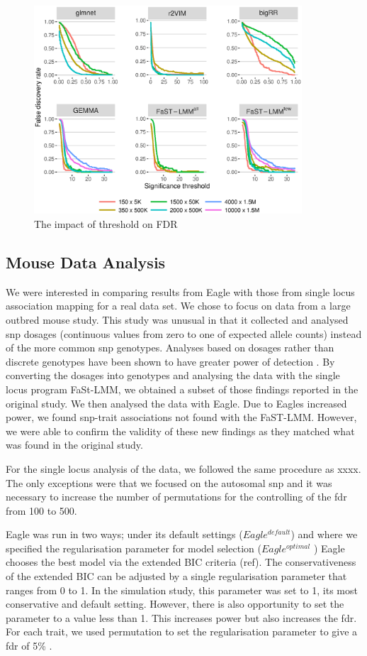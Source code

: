 \documentclass{nature}
\begin{document}
\begin{figure}
\label{fig_threshold}
\caption{The impact of threshold on FDR }
\includegraphics[width=10cm]{threshold}
\end{figure}




\subsection{Mouse Data Analysis}

We were interested in comparing results from Eagle with those from single locus association mapping for a real data set.
 We chose to focus on data from a large outbred mouse study. This study was unusual in that it collected and analysed snp dosages (continuous values from zero to one of expected allele counts)  instead of the more common snp genotypes. Analyses based on dosages rather than discrete genotypes have been shown to have greater power of detection \cite{zheng2011comparison}. By converting the dosages into genotypes and analysing the data with the single locus program FaSt-LMM, we obtained a subset of those findings reported in the original study. We then analysed the data with Eagle. Due to Eagles increased power, we found snp-trait associations not found with the FaST-LMM. However, we were 
 able to confirm the validity of these new findings as they matched what was found in the original study.

For the single locus analysis of the data, we followed the same procedure as xxxx. 
The only exceptions were that we focused on the autosomal snp and it was necessary to 
increase the number of permutations for the controlling of the fdr from 100 to 500.

Eagle was run in two ways; under its default settings ($Eagle^{default}$) and where we specified the regularisation parameter for model selection ($Eagle^{optimal}$ ) Eagle chooses the best model via the extended BIC criteria (ref). The conservativeness of the extended BIC can be adjusted by a single regularisation parameter that ranges from 0 to 1. In the simulation study, this parameter was set to 1, its most conservative and default setting. However, there is also opportunity to set the parameter to a value less than 1. This increases power but also increases the fdr. For each trait, we used permutation to set the regularisation parameter to give a fdr of 5\% .
\end{document}
